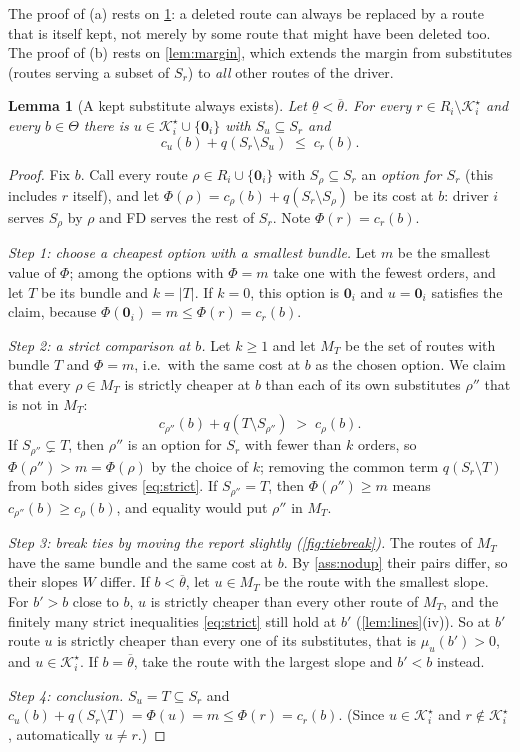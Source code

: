\documentclass[11pt]{article}
\newtheorem{lemma}{Lemma}
\theoremstyle{definition}
\theoremstyle{remark}
\newcommand{\Ks}{\mathcal{K}^{\star}}
\newcommand{\thl}{\underline{\theta}}
\newcommand{\thu}{\overline{\theta}}
\newcommand{\idle}{\mathbf{0}}
\begin{document}
The proof of (a) rests on \cref{lem:substitute}: a deleted route can always be
replaced by a route that is itself kept, not merely by some route that might
have been deleted too. The proof of (b) rests on \cref{lem:margin}, which
extends the margin from substitutes (routes serving a subset of $S_r$) to
\emph{all} other routes of the driver.

\begin{lemma}[A kept substitute always exists]\label{lem:substitute}
Let $\thl<\thu$. For every $r\in R_i\setminus\Ks_i$ and every $b\in\Theta$
there is $u\in\Ks_i\cup\{\idle_i\}$ with $S_u\subseteq S_r$ and
\[
c_u(b)+q(S_r\setminus S_u)\;\le\;c_r(b).
\]
\end{lemma}

\begin{proof}
Fix $b$. Call every route $\rho\in R_i\cup\{\idle_i\}$ with $S_\rho\subseteq S_r$
an \emph{option for $S_r$} (this includes $r$ itself), and let
$\Phi(\rho)=c_\rho(b)+q(S_r\setminus S_\rho)$ be its cost at $b$: driver $i$
serves $S_\rho$ by $\rho$ and FD serves the rest of $S_r$. Note
$\Phi(r)=c_r(b)$.

\emph{Step 1: choose a cheapest option with a smallest bundle.} Let $m$ be the
smallest value of $\Phi$; among the options with $\Phi=m$ take one with the
fewest orders, and let $T$ be its bundle and $k=|T|$. If $k=0$, this option is
$\idle_i$ and $u=\idle_i$ satisfies the claim, because
$\Phi(\idle_i)=m\le\Phi(r)=c_r(b)$.

\emph{Step 2: a strict comparison at $b$.} Let $k\ge1$ and let $M_T$ be the set
of routes with bundle $T$ and $\Phi=m$, i.e.\ with the same cost at $b$ as the
chosen option. We claim that every $\rho\in M_T$ is strictly cheaper at $b$
than each of its own substitutes $\rho''$ that is not in $M_T$:
\begin{equation}\label{eq:strict}
c_{\rho''}(b)+q(T\setminus S_{\rho''})\;>\;c_\rho(b).
\end{equation}
If $S_{\rho''}\subsetneq T$, then $\rho''$ is an option for $S_r$ with fewer than
$k$ orders, so $\Phi(\rho'')>m=\Phi(\rho)$ by the choice of $k$; removing the
common term $q(S_r\setminus T)$ from both sides gives \eqref{eq:strict}. If
$S_{\rho''}=T$, then $\Phi(\rho'')\ge m$ means $c_{\rho''}(b)\ge c_\rho(b)$, and
equality would put $\rho''$ in $M_T$.

\emph{Step 3: break ties by moving the report slightly
(\cref{fig:tiebreak}).} The routes of $M_T$ have the same bundle and the same
cost at $b$. By \cref{ass:nodup} their pairs differ, so their slopes $W$ differ.
If $b<\thu$, let $u\in M_T$ be the route with the smallest slope. For $b'>b$
close to $b$, $u$ is strictly cheaper than every other route of $M_T$, and the
finitely many strict inequalities \eqref{eq:strict} still hold at $b'$
(\cref{lem:lines}(iv)). So at $b'$ route $u$ is strictly cheaper than every one
of its substitutes, that is $\mu_u(b')>0$, and $u\in\Ks_i$. If $b=\thu$, take
the route with the largest slope and $b'<b$ instead.

\emph{Step 4: conclusion.} $S_u=T\subseteq S_r$ and
$c_u(b)+q(S_r\setminus T)=\Phi(u)=m\le\Phi(r)=c_r(b)$. (Since $u\in\Ks_i$ and
$r\notin\Ks_i$, automatically $u\ne r$.)
\end{proof}
\end{document}
